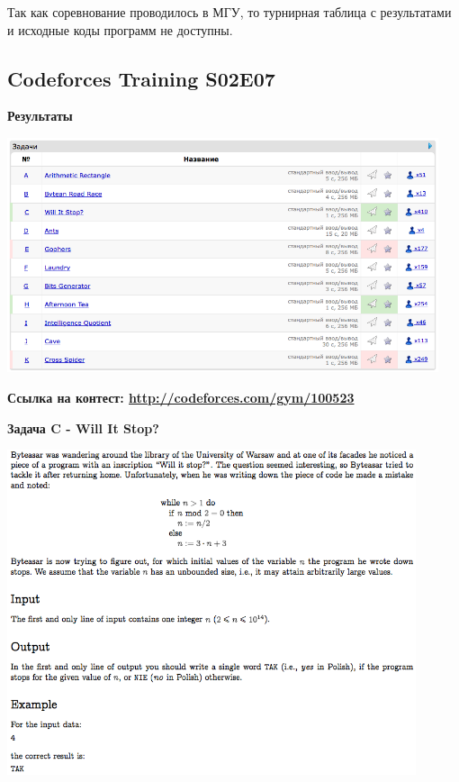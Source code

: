 \documentclass[a4paper,12pt]{article}
\begin{document}
Так как соревнование проводилось в МГУ, то турнирная таблица с результатами и исходные коды программ не доступны. \\



%
%
\newpage
\subsection{Codeforces Training S02E07}

\textbf{{\large Результаты}} \\
\begin{center}
\includegraphics[width=0.95\textwidth]{CT_S02E07/CT_S02E07_result.png}\\ [1cm]
\end{center}

\textbf{{\large Ссылка на контест: \url{http://codeforces.com/gym/100523}}}

\newpage
\textbf{{\large Задача C - Will It Stop?}}

\begin{center}
\includegraphics[width=0.9\textwidth]{CT_S02E07/CT_S02E07_C.png}\\ [1cm]
\end{center}
\end{document}
